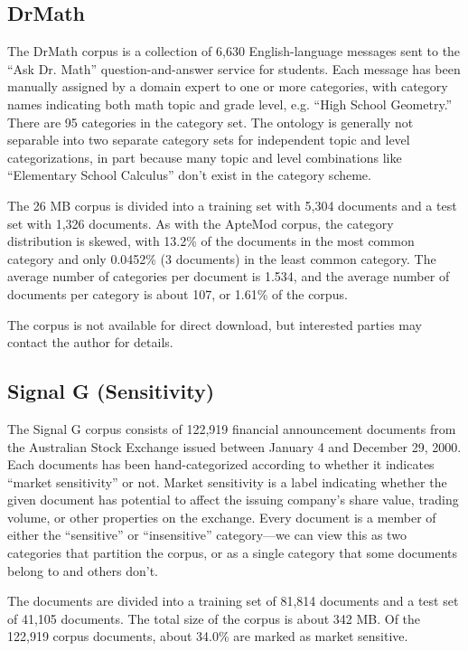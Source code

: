\subsection{DrMath}

The DrMath corpus is a collection of 6,630 English-language messages
sent to the ``Ask Dr. Math'' question-and-answer service for
students.\cite{drmath} Each message has been manually assigned by a
domain expert to one or more categories,
with category names indicating both math topic and grade level,
e.g. ``High School Geometry.''  There are 95 categories in the
category set.  The ontology is generally not
separable into two separate category sets for independent topic and
level categorizations, in part because many topic and level
combinations like ``Elementary School Calculus'' don't exist in the
category scheme.

The 26 MB corpus is divided into a training set with 5,304 documents
and a test set with 1,326 documents.  As with the ApteMod corpus, the
category distribution is skewed, with 13.2\% of the documents in the
most common category and only 0.0452\% (3 documents) in the least
common category.  The average number of categories per document is
1.534, and the average number of documents per category is about 107,
or 1.61\% of the corpus.

The corpus is not available for direct download, but interested
parties may contact the author for details.


\subsection{Signal G (Sensitivity)}

The Signal G corpus consists of 122,919 financial announcement
documents from the Australian Stock Exchange\cite{asx:02} issued
between January 4 and December 29, 2000.  Each documents has been
hand-categorized according to whether it indicates ``market
sensitivity'' or not.  Market sensitivity is a label indicating
whether the given document has potential to affect the issuing
company's share value, trading volume, or other properties on the
exchange.  Every document is a member of either the ``sensitive'' or
``insensitive'' category---we can view this as two categories that
partition the corpus, or as a single category that some documents
belong to and others don't.

The documents are divided into a training set of 81,814 documents and a
test set of 41,105 documents.  The total size of the corpus is about
342 MB.  Of the 122,919 corpus documents, about 34.0\% are marked as
market sensitive.

